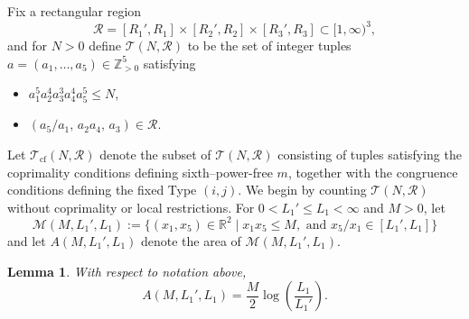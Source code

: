 \documentclass[table]{amsart}
\newtheorem{lemma}[theorem]{Lemma}
\newcommand{\Z}{\mathbb{Z}}
\newcommand{\op}[1]{\operatorname{#1}}
\numberwithin{equation}{section}
\begin{document}
\par Fix a rectangular region
\[
\mathscr{R}=[R_1',R_1]\times [R_2',R_2]\times [R_3',R_3]\subset [1,\infty)^3,
\]
and for $N>0$ define $\mathcal{T}(N,\mathscr{R})$ to be the set of integer tuples
$a=(a_1,\dots,a_5)\in\Z_{>0}^5$ satisfying
\begin{itemize}
    \item $a_1^5 a_2^4 a_3^3 a_4^4 a_5^5 \le N$,
    \item $\left(a_5/a_1,\, a_2a_4,\, a_3\right)\in \mathscr{R}$.
\end{itemize}
Let $\mathcal{T}_{\op{cf}}(N,\mathscr{R})$ denote the subset of
$\mathcal{T}(N,\mathscr{R})$ consisting of tuples satisfying the coprimality
conditions defining sixth–power-free $m$, together with the congruence
conditions defining the fixed Type $(i,j)$.
We begin by counting $\mathcal{T}(N,\mathscr{R})$ without coprimality or local
restrictions. For $0<L_1'\leq L_1<\infty$ and $M>0$, let \[\mathcal{M}(M, L_1', L_1):=\{(x_1, x_5)\in \mathbb{R}^2\mid x_1x_5\leq M,\text{ and }x_5/x_1\in [L_1',L_1]\}\] and let $A(M, L_1', L_1)$ denote the area of $\mathcal{M}(M, L_1', L_1)$.


\begin{lemma}
With respect to notation above,
\[
A(M,L_1',L_1)
=
\frac{M}{2}\log\!\left(\frac{L_1}{L_1'}\right).
\]
\end{lemma}
\end{document}
